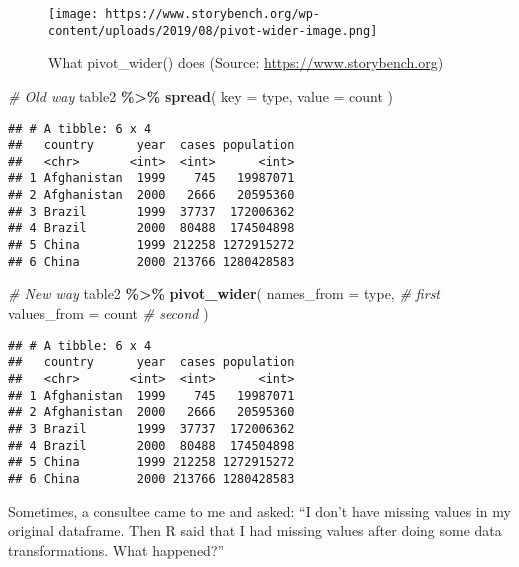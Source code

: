 \documentclass[
]{book}
\newenvironment{Shaded}{\begin{snugshade}}{\end{snugshade}}
\newcommand{\CommentTok}[1]{\textcolor[rgb]{0.56,0.35,0.01}{\textit{#1}}}
\newcommand{\DataTypeTok}[1]{\textcolor[rgb]{0.13,0.29,0.53}{#1}}
\newcommand{\KeywordTok}[1]{\textcolor[rgb]{0.13,0.29,0.53}{\textbf{#1}}}
\newcommand{\NormalTok}[1]{#1}
\newcommand{\OperatorTok}[1]{\textcolor[rgb]{0.81,0.36,0.00}{\textbf{#1}}}
\newcommand{\StringTok}[1]{\textcolor[rgb]{0.31,0.60,0.02}{#1}}
\begin{document}
\begin{figure}
\centering
\texttt{[image: https://www.storybench.org/wp-content/uploads/2019/08/pivot-wider-image.png]}
\caption{What pivot\_wider() does (Source: \url{https://www.storybench.org})}
\end{figure}

\begin{Shaded}
\begin{Highlighting}[]
\CommentTok{\# Old way}
\NormalTok{table2 }\OperatorTok{\%\textgreater{}\%}
\StringTok{  }\KeywordTok{spread}\NormalTok{(}
    \DataTypeTok{key =}\NormalTok{ type,}
    \DataTypeTok{value =}\NormalTok{ count}
\NormalTok{  )}
\end{Highlighting}
\end{Shaded}

\begin{verbatim}
## # A tibble: 6 x 4
##   country      year  cases population
##   <chr>       <int>  <int>      <int>
## 1 Afghanistan  1999    745   19987071
## 2 Afghanistan  2000   2666   20595360
## 3 Brazil       1999  37737  172006362
## 4 Brazil       2000  80488  174504898
## 5 China        1999 212258 1272915272
## 6 China        2000 213766 1280428583
\end{verbatim}

\begin{Shaded}
\begin{Highlighting}[]
\CommentTok{\# New way}
\NormalTok{table2 }\OperatorTok{\%\textgreater{}\%}
\StringTok{  }\KeywordTok{pivot\_wider}\NormalTok{(}
    \DataTypeTok{names\_from =}\NormalTok{ type, }\CommentTok{\# first}
    \DataTypeTok{values\_from =}\NormalTok{ count }\CommentTok{\# second}
\NormalTok{  )}
\end{Highlighting}
\end{Shaded}

\begin{verbatim}
## # A tibble: 6 x 4
##   country      year  cases population
##   <chr>       <int>  <int>      <int>
## 1 Afghanistan  1999    745   19987071
## 2 Afghanistan  2000   2666   20595360
## 3 Brazil       1999  37737  172006362
## 4 Brazil       2000  80488  174504898
## 5 China        1999 212258 1272915272
## 6 China        2000 213766 1280428583
\end{verbatim}

Sometimes, a consultee came to me and asked: ``I don't have missing values in my original dataframe. Then R said that I had missing values after doing some data transformations. What happened?''
\end{document}
